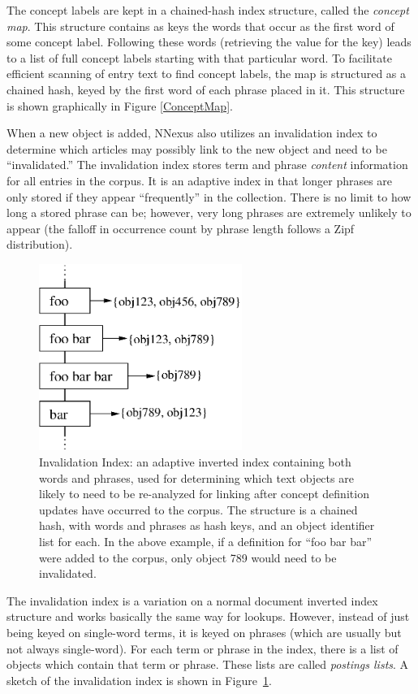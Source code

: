 \documentclass{article}
\begin{document}
The concept labels are kept in a chained-hash index structure, called the \emph{concept map}.  This structure contains as keys the words that occur as the first word of some concept label.  Following these words (retrieving the value for the key) leads to a list of full concept labels starting with that particular word. To facilitate efficient scanning of entry text to find concept labels, the map is structured as a chained hash, keyed by the first word of each phrase placed in it. This structure is shown graphically in Figure \ref{ConceptMap}.


When a new object is added, NNexus also utilizes an invalidation index to determine which articles may possibly link to the new object and need to be ``invalidated.'' The invalidation index stores term and phrase \emph{content} information for all entries in the corpus.  It is an adaptive index in that longer phrases are only stored if they appear ``frequently'' in the collection.  There is no limit to how long a stored phrase can be; however, very long phrases are extremely unlikely to appear (the falloff in occurrence count by phrase length follows a Zipf distribution).

\begin{figure}
\centerline{\includegraphics[width=2.6in]{figures/struct_inval}}
\caption{Invalidation Index: an adaptive inverted index containing both words and phrases, used for determining which text objects are likely to need to be re-analyzed for linking after concept definition updates have occurred to the corpus.  The structure is a chained hash, with words and phrases as hash keys, and an object identifier list for each.  In the above example, if a definition for ``foo bar bar'' were added to the corpus, only object 789 would need to be invalidated.}
\label{StructInval}
\end{figure}

The invalidation index is a variation on a normal document inverted index structure and works basically the same way for lookups.  However, instead of just being keyed on single-word terms, it is keyed on phrases (which are usually but not always single-word).   For each term or phrase in the index, there is a list of objects which contain that term or phrase.  These lists are called \emph{postings lists}.  A sketch of the invalidation index is shown in Figure~\ref{StructInval}.
\end{document}
